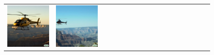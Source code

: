 \begin{figure}[ht!]
\begin{adjustwidth}{-0.8in}{-0.5in}
\begin{tabular}{cccccccccccccccccccc}
\multicolumn{2}{c}{\includegraphics[width=\threebythreecolwidth\textwidth]{figures/cherries/grand_canyon1.jpg}} &
\multicolumn{2}{c}{\includegraphics[width=\threebythreecolwidth\textwidth]{figures/cherries/grand_canyon2.jpg}} &

\end{tabular}
\end{adjustwidth}
\end{figure}
